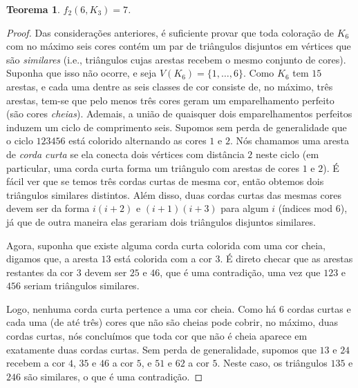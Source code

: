 \documentclass[11pt,twoside,a4paper]{book}
\newtheorem{teorema}{Teorema}[section]
\theoremstyle{note}
\begin{document}
\begin{teorema}
       $f_2(6,K_3)=7$.
\end{teorema}
\begin{proof}
    Das considerações anteriores, é suficiente provar que 
    toda coloração de $K_6$ com no máximo seis cores contém um par de triângulos disjuntos em vértices que são \emph{similares} (i.e., triângulos cujas arestas recebem o mesmo conjunto de cores). 
   Suponha que isso não ocorre, e seja $V(K_6) =\{1,\dots,6\}$.
   Como $K_6$ tem $15$ arestas, e  cada uma dentre as seis classes de cor consiste de, no máximo, três arestas, tem-se que pelo menos três cores geram um emparelhamento perfeito (são cores \emph{cheias}). 
   Ademais, a união de quaisquer dois emparelhamentos perfeitos induzem um ciclo de comprimento seis.
   Supomos sem perda de generalidade que o ciclo $123456$ está colorido alternando as cores $1$ e $2$. 
   Nós chamamos uma aresta de \emph{corda curta} se ela conecta dois vértices com distância $2$ neste ciclo (em particular, uma corda curta forma um triângulo com arestas de cores $1$ e $2$). 
   É fácil ver que se temos três cordas curtas de mesma cor, então obtemos dois triângulos similares distintos. 
   Além disso, duas cordas curtas das mesmas cores devem ser da forma $i(i+2)$ e $(i+1)(i+3)$ para algum $i$ (índices mod $6$), já que de outra maneira elas gerariam dois triângulos disjuntos similares.
    
    Agora, suponha que existe alguma corda curta colorida com uma cor cheia, digamos que, a aresta $13$ está colorida com a cor $3$. É direto checar que as arestas restantes da cor $3$ devem ser $25$ e $46$, que é uma contradição, uma vez que $123$ e $456$ seriam triângulos similares.  
    
    Logo, nenhuma corda curta pertence a uma cor cheia. Como há $6$ cordas curtas e cada uma (de até três) cores que não são cheias pode cobrir, no máximo, duas cordas curtas, nós concluímos que toda cor que não é cheia aparece em exatamente duas cordas curtas. Sem perda de generalidade, supomos que $13$ e $24$ recebem a cor $4$, $35$ e $46$ a cor $5$, e $51$ e $62$ a cor $5$. Neste caso, os triângulos $135$ e $246$ são similares, o que é uma contradição.
\end{proof}
\end{document}
